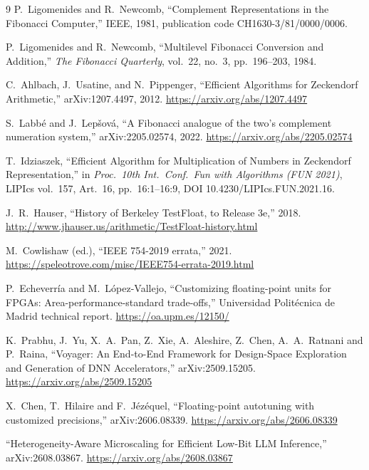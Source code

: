 \documentclass[11pt]{article}
\theoremstyle{definition}
\begin{document}
\begin{thebibliography}{9}
 P.~Ligomenides and R.~Newcomb, ``Complement Representations in the Fibonacci Computer,'' IEEE, 1981, publication code CH1630-3/81/0000/0006.

 P.~Ligomenides and R.~Newcomb, ``Multilevel Fibonacci Conversion and Addition,'' \emph{The Fibonacci Quarterly}, vol.~22, no.~3, pp.~196--203, 1984.

 C.~Ahlbach, J.~Usatine, and N.~Pippenger, ``Efficient Algorithms for Zeckendorf Arithmetic,'' arXiv:1207.4497, 2012. \url{https://arxiv.org/abs/1207.4497}

 S.~Labb\'{e} and J.~Lep\v{s}ov\'{a}, ``A Fibonacci analogue of the two's complement numeration system,'' arXiv:2205.02574, 2022. \url{https://arxiv.org/abs/2205.02574}

 T.~Idziaszek, ``Efficient Algorithm for Multiplication of Numbers in Zeckendorf Representation,'' in \emph{Proc.\ 10th Int.\ Conf.\ Fun with Algorithms (FUN 2021)}, LIPIcs vol.~157, Art.\ 16, pp.~16:1--16:9, DOI 10.4230/LIPIcs.FUN.2021.16.

 J.~R.~Hauser, ``History of Berkeley TestFloat, to Release 3e,'' 2018. \url{http://www.jhauser.us/arithmetic/TestFloat-history.html}

 M.~Cowlishaw (ed.), ``IEEE 754-2019 errata,'' 2021. \url{https://speleotrove.com/misc/IEEE754-errata-2019.html}

 P.~Echeverr\'{i}a and M.~L\'{o}pez-Vallejo, ``Customizing floating-point units for FPGAs: Area-performance-standard trade-offs,'' Universidad Polit\'{e}cnica de Madrid technical report. \url{https://oa.upm.es/12150/}

 K.~Prabhu, J.~Yu, X.~A.~Pan, Z.~Xie, A.~Aleshire, Z.~Chen, A.~A.~Ratnani and P.~Raina, ``Voyager: An End-to-End Framework for Design-Space Exploration and Generation of DNN Accelerators,'' arXiv:2509.15205. \url{https://arxiv.org/abs/2509.15205}

 X.~Chen, T.~Hilaire and F.~J\'{e}z\'{e}quel, ``Floating-point autotuning with customized precisions,'' arXiv:2606.08339. \url{https://arxiv.org/abs/2606.08339}

 ``Heterogeneity-Aware Microscaling for Efficient Low-Bit LLM Inference,'' arXiv:2608.03867. \url{https://arxiv.org/abs/2608.03867}


\end{thebibliography}
\end{document}
